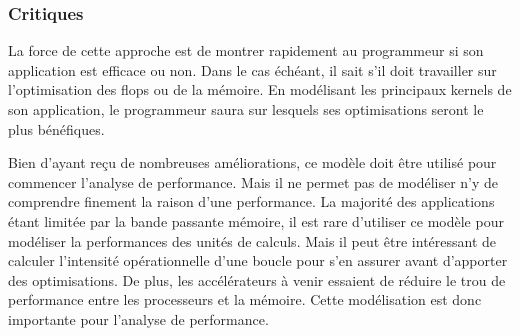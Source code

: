 \subsubsection{Critiques}

La force de cette approche est de montrer rapidement au programmeur si son application est efficace ou non. Dans le cas échéant, il sait s’il doit travailler sur l’optimisation des flops ou de la mémoire. En modélisant les principaux kernels de son application, le programmeur saura sur lesquels ses optimisations seront le plus bénéfiques.

Bien d’ayant reçu de nombreuses améliorations, ce modèle doit être utilisé pour commencer l’analyse de performance. Mais il ne permet pas de modéliser n’y de comprendre finement la raison d’une performance.
La majorité des applications étant limitée par la bande passante mémoire, il est rare d’utiliser ce modèle pour modéliser la performances des unités de calculs. Mais il peut être intéressant de calculer l’intensité opérationnelle d’une boucle pour s’en assurer avant d’apporter des optimisations. De plus, les accélérateurs à venir essaient de réduire le trou de performance entre les processeurs et la mémoire. Cette modélisation est donc importante pour l’analyse de performance.


\printbibliography[heading=references,segment=\therefsegment]

